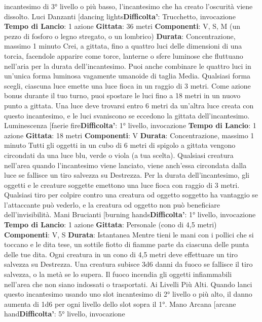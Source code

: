 \begin{multicols}{2}
incantesimo di 3° livello o più basso, l’incantesimo che
ha creato l’oscurità viene dissolto.
Luci Danzanti
[dancing lights\textbf{Difficolta'}:
Trucchetto, invocazione
\textbf{Tempo di Lancio}: 1 azione
\textbf{Gittata}: 36 metri
\textbf{Componenti}: V, S, M (un pezzo di fosforo o legno
stregato, o un lombrico)
\textbf{Durata}: Concentrazione, massimo 1 minuto
Crei, a gittata, fino a quattro luci delle dimensioni di una
torcia, facendole apparire come torce, lanterne o sfere
luminose che fluttuano nell’aria per la durata
dell’incantesimo. Puoi anche combinare le quattro luci
in un’unica forma luminosa vagamente umanoide di
taglia Media. Qualsiasi forma scegli, ciascuna luce
emette una luce fioca in un raggio di 3 metri.
Come azione bonus durante il tuo turno, puoi spostare
le luci fino a 18 metri in un nuovo punto a gittata. Una
luce deve trovarsi entro 6 metri da un’altra luce creata
con questo incantesimo, e le luci svaniscono se
eccedono la gittata dell’incantesimo.
Luminescenza
[faerie fire\textbf{Difficolta'}:
1° livello, invocazione
\textbf{Tempo di Lancio}: 1 azione
\textbf{Gittata}: 18 metri
\textbf{Componenti}: V
\textbf{Durata}: Concentrazione, massimo 1 minuto
Tutti gli oggetti in un cubo di 6 metri di spigolo a gittata
vengono circondati da una luce blu, verde o viola (a tua
scelta). Qualsiasi creatura nell’area quando
l’incantesimo viene lanciato, viene anch’essa circondata
dalla luce se fallisce un tiro salvezza su Destrezza. Per
la durata dell’incantesimo, gli oggetti e le creature
soggette emettono una luce fioca con raggio di 3 metri.
Qualsiasi tiro per colpire contro una creatura od oggetto
soggetto ha vantaggio se l’attaccante può vederlo, e la
creatura od oggetto non può beneficiare dell’invisibilità.
Mani Brucianti
[burning hands\textbf{Difficolta'}:
1° livello, invocazione
\textbf{Tempo di Lancio}: 1 azione
\textbf{Gittata}: Personale (cono di 4,5 metri)
\textbf{Componenti}: V, S
\textbf{Durata}: Istantanea
Mentre tieni le mani con i pollici che si toccano e le dita
tese, un sottile fiotto di fiamme parte da ciascuna delle
punta delle tue dita. Ogni creatura in un cono di 4,5
metri deve effettuare un tiro salvezza su Destrezza.
Una creatura subisce 3d6 danni da fuoco se fallisce il
tiro salvezza, o la metà se lo supera.
Il fuoco incendia gli oggetti infiammabili nell’area che
non siano indossati o trasportati.
Ai Livelli Più Alti. Quando lanci questo incantesimo
usando uno slot incantesimo di 2° livello o più alto, il
danno aumenta di 1d6 per ogni livello dello slot sopra il
1°.
Mano Arcana
[arcane hand\textbf{Difficolta'}:
5° livello, invocazione

\end{multicols}
